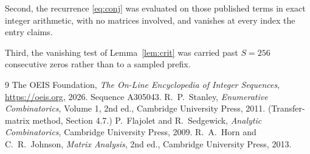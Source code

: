\documentclass[11pt,a4paper]{article}
\theoremstyle{plain}
\theoremstyle{definition}
\begin{document}
Second, the recurrence \eqref{eq:conj} was evaluated on those published terms in exact
integer arithmetic, with no matrices involved, and vanishes at every index the entry claims.

Third, the vanishing test of Lemma~\ref{lem:crit} was carried past $S=256$ consecutive
zeros rather than to a sampled prefix.

\begin{thebibliography}{9}
 The OEIS Foundation, \emph{The On-Line Encyclopedia of Integer
Sequences}, \url{https://oeis.org}, 2026. Sequence A305043.
 R.~P.~Stanley, \emph{Enumerative Combinatorics}, Volume 1, 2nd ed.,
Cambridge University Press, 2011. (Transfer-matrix method, Section 4.7.)
 P.~Flajolet and R.~Sedgewick, \emph{Analytic Combinatorics}, Cambridge
University Press, 2009.
 R.~A.~Horn and C.~R.~Johnson, \emph{Matrix Analysis}, 2nd ed., Cambridge
University Press, 2013.
\end{thebibliography}
\end{document}
